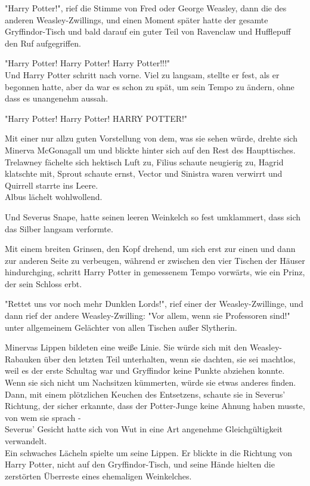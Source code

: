 {"Harry Potter!", rief die Stimme von Fred oder George Weasley, dann die des anderen Weasley-Zwillings, und einen Moment später hatte der gesamte Gryffindor-Tisch und bald darauf ein guter Teil von Ravenclaw und Hufflepuff den Ruf aufgegriffen.

"Harry Potter! Harry Potter! Harry Potter!!!"\\ Und Harry Potter schritt nach vorne. Viel zu langsam, stellte er fest, als er begonnen hatte, aber da war es schon zu spät, um sein Tempo zu ändern, ohne dass es unangenehm aussah.

"Harry Potter! Harry Potter! HARRY POTTER!"

Mit einer nur allzu guten Vorstellung von dem, was sie sehen würde, drehte sich Minerva McGonagall um und blickte hinter sich auf den Rest des Haupttisches.\\ Trelawney fächelte sich hektisch Luft zu, Filius schaute neugierig zu, Hagrid klatschte mit, Sprout schaute ernst, Vector und Sinistra waren verwirrt und Quirrell starrte ins Leere.\\ Albus lächelt wohlwollend.

Und Severus Snape, hatte seinen leeren Weinkelch so fest umklammert, dass sich das Silber langsam verformte.

Mit einem breiten Grinsen, den Kopf drehend, um sich erst zur einen und dann zur anderen Seite zu verbeugen, während er zwischen den vier Tischen der Häuser hindurchging, schritt Harry Potter in gemessenem Tempo vorwärts, wie ein Prinz, der sein Schloss erbt.

"Rettet uns vor noch mehr Dunklen Lords!", rief einer der Weasley-Zwillinge, und dann rief der andere Weasley-Zwilling: "Vor allem, wenn sie Professoren sind!"\\ unter allgemeinem Gelächter von allen Tischen außer Slytherin.

Minervas Lippen bildeten eine weiße Linie. Sie würde sich mit den Weasley-Rabauken über den letzten Teil unterhalten, wenn sie dachten, sie sei machtlos, weil es der erste Schultag war und Gryffindor keine Punkte abziehen konnte.\\ Wenn sie sich nicht um Nachsitzen kümmerten, würde sie etwas anderes finden. Dann, mit einem plötzlichen Keuchen des Entsetzens, schaute sie in Severus' Richtung, der sicher erkannte, dass der Potter-Junge keine Ahnung haben musste, von wem sie sprach -\\ Severus' Gesicht hatte sich von Wut in eine Art angenehme Gleichgültigkeit verwandelt.\\ Ein schwaches Lächeln spielte um seine Lippen. Er blickte in die Richtung von Harry Potter, nicht auf den Gryffindor-Tisch, und seine Hände hielten die zerstörten Überreste eines ehemaligen Weinkelches.

}
